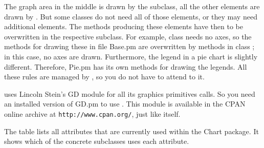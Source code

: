 The graph area in the middle is drawn by the subclass, all the other
elements are drawn by . But some classes do not need
all of those elements, or they may need additional elements. The
 methods producing these elements have then to be
overwritten in the respective subclass. For example, class
 needs no axes, so the methods for drawing these in
file Base.pm are overwritten by methods in class ; in
this case, no axes are drawn. Furthermore, the legend in a pie chart is
slightly different. Therefore, Pie.pm has its own methods for drawing
the legends. All these rules are managed by , so you do not
have to attend to it.

 uses Lincoln Stein's GD module for all its graphics
primitives calls. So you need an installed version of GD.pm to use
. This module is available in the CPAN online archive at
\texttt{http://www.cpan.org/}, just like  itself.

The table lists all attributes that are currently used within the Chart
package. It shows which of the concrete subclasses uses each attribute.

